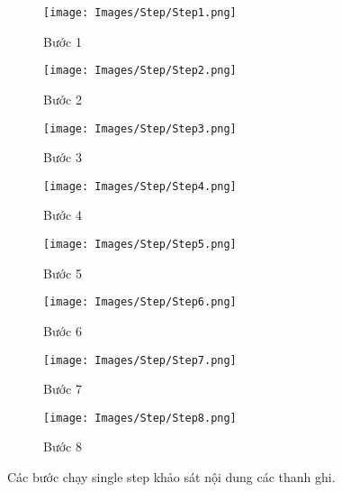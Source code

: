\begin{figure}[H]
    \centering
    \begin{subfigure}[b]{0.48\textwidth}
        \texttt{[image: Images/Step/Step1.png]}
        \caption{Bước 1}
    \end{subfigure}
    \hfill
    \begin{subfigure}[b]{0.48\textwidth}
        \texttt{[image: Images/Step/Step2.png]}
        \caption{Bước 2}
    \end{subfigure}
    
    \vspace{0.5cm}
    
    \begin{subfigure}[b]{0.48\textwidth}
        \texttt{[image: Images/Step/Step3.png]}
        \caption{Bước 3}
    \end{subfigure}
    \hfill
    \begin{subfigure}[b]{0.48\textwidth}
        \texttt{[image: Images/Step/Step4.png]}
        \caption{Bước 4}
    \end{subfigure}
    
    \vspace{0.5cm}
    
    \begin{subfigure}[b]{0.48\textwidth}
        \texttt{[image: Images/Step/Step5.png]}
        \caption{Bước 5}
    \end{subfigure}
    \hfill
    \begin{subfigure}[b]{0.48\textwidth}
        \texttt{[image: Images/Step/Step6.png]}
        \caption{Bước 6}
    \end{subfigure}
    
    \vspace{0.5cm}
    
    \begin{subfigure}[b]{0.48\textwidth}
        \texttt{[image: Images/Step/Step7.png]}
        \caption{Bước 7}
    \end{subfigure}
    \hfill
    \begin{subfigure}[b]{0.48\textwidth}
        \texttt{[image: Images/Step/Step8.png]}
        \caption{Bước 8}
    \end{subfigure}
    
    \caption{Các bước chạy single step khảo sát nội dung các thanh ghi.}
    \label{fig:debug-steps}
\end{figure}